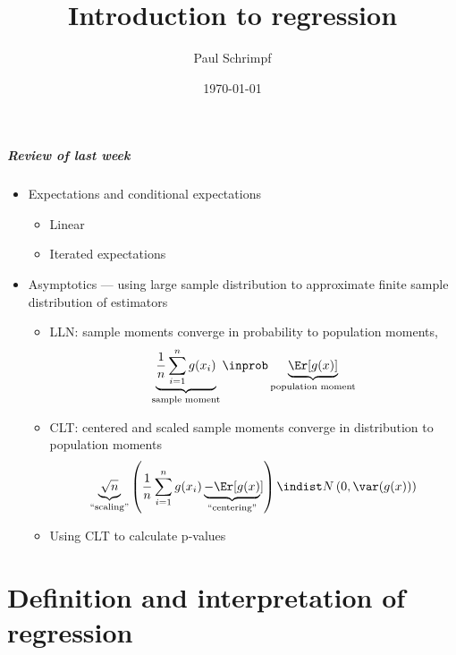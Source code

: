\title{Introduction to regression}
\author{Paul Schrimpf}
\date{\today}



\frame{\titlepage}

\begin{frame}[shrink]
  \frametitle{Review of last week}
  \begin{itemize}
  \item Expectations and conditional expectations    
    \begin{itemize}
    \item Linear
    \item Iterated expectations
    \end{itemize}
  \item Asymptotics --- using large sample distribution to approximate
    finite sample distribution of estimators
    \begin{itemize}
    \item LLN: sample moments converge in probability to population moments, 
      \[ \underbrace{\frac{1}{n} \sum_{i=1}^n g(x_i)}_{\text{sample
          moment}} \inprob \underbrace{\Er[g(x)]}_{\text{population
          moment}} \]
    \item CLT: centered and scaled sample moments converge in
      distribution to population moments
      \[ \underbrace{\sqrt{n}}_{\text{``scaling''}} \left( \frac{1}{n}
        \sum_{i=1}^n g(x_i) \underbrace{-
          \Er[g(x)}_{\text{``centering''}}] \right) \indist N\left(0,
        \var(g(x))\right) \]
    \item Using CLT to calculate p-values
    \end{itemize}
  \end{itemize}
\end{frame}

\part{Definition and interpretation of regression}
\frame{\partpage}

\begin{frame}
  \tableofcontents  
\end{frame}

